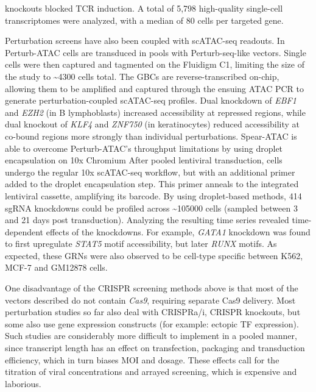 knockouts blocked TCR induction. A total of 5,798 high-quality single-cell transcriptomes were analyzed, with a median of 80 cells per targeted gene.

Perturbation screens have also been coupled with scATAC-seq readouts. In Perturb-ATAC cells are transduced in pools with Perturb-seq-like vectors. Single cells were then captured and tagmented on the Fluidigm C1, limiting the size of the study to \textasciitilde\num{4300} cells total. The GBCs are reverse-transcribed on-chip, allowing them to be amplified and captured through the ensuing ATAC PCR to generate perturbation-coupled scATAC-seq profiles. Dual knockdown of \textit{EBF1} and \textit{EZH2} (in B lymphoblasts) increased accessibility at repressed regions, while dual knockout of \textit{KLF4} and \textit{ZNF750} (in keratinocytes) reduced accessibility at co-bound regions more strongly than individual perturbations. Spear-ATAC is able to overcome Perturb-ATAC's throughput limitations by using droplet encapsulation on 10x Chromium After pooled lentiviral transduction, cells undergo the regular 10x scATAC-seq workflow, but with an additional primer added to the droplet encapsulation step. This primer anneals to the integrated lentiviral cassette, amplifying its barcode. By using droplet-based methods, \num{414} sgRNA knockdowns could be profiled across \textasciitilde\num{105000} cells (sampled between 3 and 21 days post transduction). Analyzing the resulting time series revealed time-dependent effects of the knockdowns. For example, \textit{GATA1} knockdown was found to first upregulate \textit{STAT5} motif accessibility, but later \textit{RUNX} motifs. As expected, these GRNs were also observed to be cell-type specific between K562, MCF-7 and GM12878 cells.


One disadvantage of the CRISPR screening methods above is that most of the vectors described do not contain \textit{Cas9}, requiring separate Cas9 delivery. Most perturbation studies so far also deal with CRISPRa/i, CRISPR knockouts, but some also use gene expression constructs (for example: ectopic TF expression). Such studies are considerably more difficult to implement in a pooled manner, since transcript length has an effect on transfection, packaging and transduction efficiency, which in turn biases MOI and dosage. These effects call for the titration of viral concentrations and arrayed screening, which is expensive and laborious.

